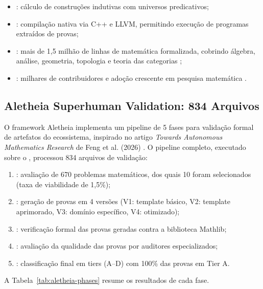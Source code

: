 \begin{itemize}
\item {}: cálculo de construções indutivas
com universos predicativos;
\item {}: compilação nativa via C++ e LLVM,
permitindo execução de programas extraídos de provas;
\item {}: mais de 1,5 milhão de linhas de
matemática formalizada, cobrindo álgebra, análise, geometria,
topologia e teoria das categorias \cite{mathlib2024};
\item {}: milhares de contribuidores e
adoção crescente em pesquisa matemática \cite{buzzard2023formal}.
\end{itemize}

\subsection{Aletheia Superhuman Validation: 834 Arquivos}

O framework Aletheia implementa um pipeline de 5 fases para
validação formal de artefatos do ecossistema, inspirado no artigo
\textit{Towards Autonomous Mathematics Research} de Feng et al.
(2026) \cite{feng2026towards}. O pipeline completo, executado sobre
o \opencodeeco{}, processou 834 arquivos de validação:

\begin{enumerate}
\item {}: avaliação de 670
problemas matemáticos, dos quais 10 foram selecionados (taxa de
viabilidade de 1,5\%);
\item {}: geração de provas em
4 versões (V1: template básico, V2: template aprimorado, V3:
domínio específico, V4: otimizado);
\item {}: verificação formal
das provas geradas contra a biblioteca Mathlib;
\item {}: avaliação da
qualidade das provas por auditores especializados;
\item {}: classificação final
em tiers (A–D) com 100\% das provas em Tier A.
\end{enumerate}

A Tabela~\ref{tab:aletheia-phases} resume os resultados de cada fase.

